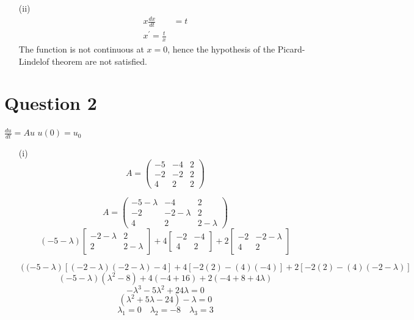 \documentclass[12pt,a4paper]{article}
\begin{document}
\begin{itemize}
\begin{itemize}
\item[(ii)]
\begin{align*}
x\frac{dx}{dt}&=t\\
x^{'}=\frac{t}{x}
\end{align*}
The function is not continuous at $x=0$, hence the hypothesis of the Picard-Lindelof theorem are not satisfied.
\end{itemize}

\section*{Question 2}
$\frac{du}{dt}=Au$ \quad \quad$u\left(0\right)=u_{0}$
\begin{itemize}
\item[(i)]
\begin{equation*}
A = 
\begin{pmatrix}
-5 & -4 & 2 \\
-2 & -2 & 2 \\
4 & 2 & 2
\end{pmatrix}
\end{equation*}

\begin{equation*}
A = 
\begin{pmatrix}
-5-\lambda & -4 & 2 \\
-2 & -2-\lambda & 2 \\
4 & 2 & 2-\lambda
\end{pmatrix}
\end{equation*}
\[
\left(-5-\lambda\right)
\begin{bmatrix}
    -2-\lambda  &  2     \\
    2  &  2-\lambda      
\end{bmatrix} 
+4
\begin{bmatrix}
    -2  &  -4      \\
    4 &  2      
\end{bmatrix} 
+2
\begin{bmatrix}
    -2  &  -2-\lambda      \\
    4 &  2      
\end{bmatrix} 
\]

$\left((-5-\lambda\right)[\left(-2-\lambda\right)\left(-2-\lambda\right)-4]+4[-2\left(2\right)-\left(4\right)\left(-4\right)]+2[-2\left(2\right)-\left(4\right)\left(-2-\lambda\right)]$\\
$$\left(-5-\lambda\right)\left(\lambda^{2}-8\right)+4\left(-4+16\right)+2\left(-4+8+4\lambda\right)$$
$$-\lambda^{3}-5\lambda^{2}+24\lambda=0$$
$$\left(\lambda^{2}+5\lambda-24\right)-\lambda=0$$
$$\lambda_{1}=0 \quad \lambda_{2}=-8 \quad \lambda_{3}=3$$


\end{itemize}
\end{itemize}
\end{document}
